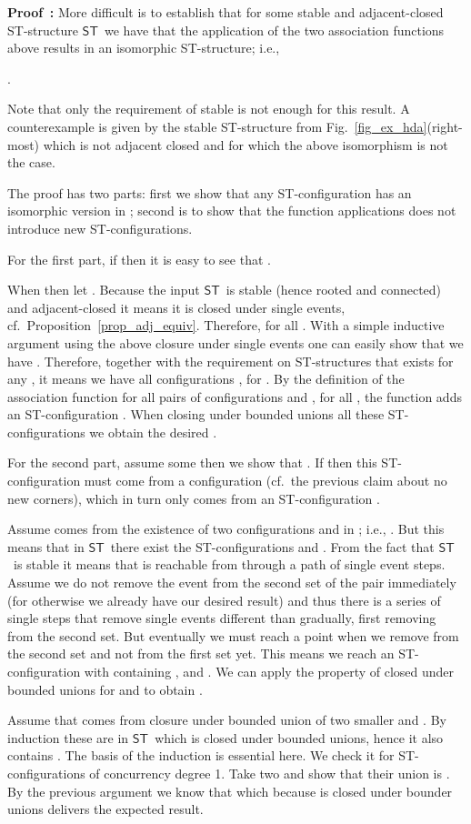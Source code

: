 \documentclass[submission,copyright,creativecommons]{eptcs}
\newenvironment{proof}[1][\!\!\,]{\vspace{1ex}\noindent\textbf{Proof #1: }}{\hfill\vspace{2ex}}
\newcounter{case}
\newcommand\ST{\ensuremath{\mathsf{ST}}}
\begin{document}
\begin{proof}
\vspace{1ex}
More difficult is to establish that for some stable and adjacent-closed ST-structure \ST\ we have that the application of the two association functions above results in an isomorphic ST-structure; i.e., 

\vspace{-1ex}\centerline{.}

Note that only the requirement of stable is not enough for this result. A counterexample is given by the stable ST-structure from Fig.~\ref{fig_ex_hda}(right-most) which is not adjacent closed and for which the above isomorphism is not the case.

The proof has two parts: first we show that any ST-configuration  has an isomorphic version in ; second is to show that the function applications  does not introduce new ST-configurations.

For the first part, if  then it is easy to see that .

When  then let . Because the input \ST\ is stable (hence rooted and connected) and adjacent-closed it means it is closed under single events, cf.~Proposition~\ref{prop_adj_equiv}. Therefore,  for all . With a simple inductive argument using the above closure under single events one can easily show that  we have . Therefore, together with the requirement on ST-structures that  exists for any , it means we have all configurations , for . By the definition of the association function  for all pairs of configurations  and , for all , the function adds an ST-configuration . When closing under bounded unions all these ST-configurations we obtain the desired .

For the second part, assume some  then we show that . If  then this ST-configuration must come from a configuration  (cf.\ the previous claim about no new corners), which in turn only comes from an ST-configuration .

Assume  comes from the existence of two configurations  and  in ; i.e., . But this means that in \ST\ there exist the ST-configurations  and . From the fact that \ST\ is stable it means that  is reachable from  through a path of single event steps. Assume we do not remove the event  from the second set of the pair immediately (for otherwise we already have our desired result) and thus there is a series of single steps that remove single events different than  gradually, first removing from the second set. But eventually we must reach a point when we remove  from the second set and not from the first set yet. This means we reach an ST-configuration  with  containing , and . We can apply the property of closed under bounded unions for  and  to obtain .

Assume that  comes from closure under bounded union of two smaller  and . By induction these are in \ST\ which is closed under bounded unions, hence it also contains . 
The basis of the induction is essential here. We check it for ST-configurations of concurrency degree 1. Take two  and show that their union is . By the previous argument we know that  which because  is closed under bounder unions delivers the expected result.
\end{proof}
\end{document}

